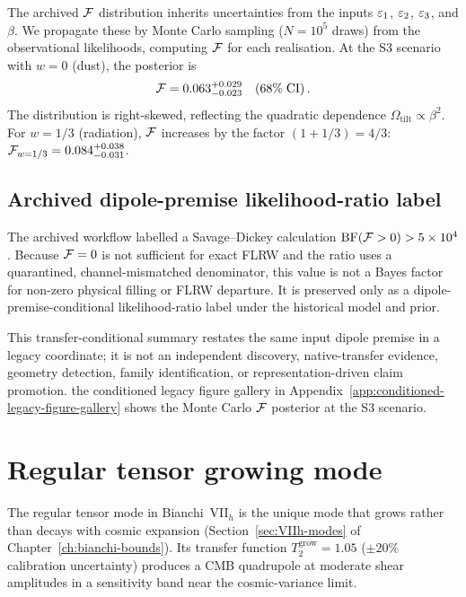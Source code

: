 The archived $\mathcal{F}$ distribution inherits uncertainties from the inputs
$\varepsilon_1$, $\varepsilon_2$, $\varepsilon_3$, and $\beta$.  We propagate these
by Monte Carlo sampling ($N = 10^5$ draws) from the
observational likelihoods, computing $\mathcal{F}$ for each realisation.
At the S3 scenario with $w = 0$ (dust), the posterior is
\begin{equation}\label{eq:FF-posterior}
\mathcal{F} = 0.063^{+0.029}_{-0.023}\quad (68\%\;\mathrm{CI})\,.
\end{equation}
The distribution is right-skewed, reflecting the quadratic
dependence $\Omega_{\mathrm{tilt}} \propto \beta^2$.
For $w = 1/3$ (radiation), $\mathcal{F}$ increases by the factor
$(1 + 1/3) = 4/3$:
$\mathcal{F}_{w=1/3} = 0.084^{+0.038}_{-0.031}$.

\subsection{Archived dipole-premise likelihood-ratio label}
\label{sec:filling-BF}

The archived workflow labelled a Savage--Dickey calculation
$\mathrm{BF}(\mathcal{F}>0)>5\times10^4$.  Because $\mathcal{F}=0$ is not
sufficient for exact FLRW and the ratio uses a quarantined,
channel-mismatched denominator, this value is not a Bayes factor
for non-zero physical filling or FLRW departure.  It is preserved
only as a dipole-premise-conditional likelihood-ratio label under
the historical model and prior.

This transfer-conditional summary restates the same input dipole
premise in a legacy coordinate; it is not an independent discovery,
native-transfer evidence, geometry detection, family
identification, or representation-driven claim promotion.
the conditioned legacy figure gallery in Appendix~\ref{app:conditioned-legacy-figure-gallery} shows the Monte Carlo
$\mathcal{F}$ posterior at the S3 scenario.


\section{Regular tensor growing mode}\label{sec:growing}

The regular tensor mode in Bianchi~VII$_h$ is the unique mode
that grows rather than decays with cosmic expansion
(Section~\ref{sec:VIIh-modes} of
Chapter~\ref{ch:bianchi-bounds}).  Its transfer function
$T_2^{\mathrm{grow}} = 1.05$ ($\pm 20\%$ calibration
uncertainty) produces a CMB quadrupole at moderate shear
amplitudes in a sensitivity band near the cosmic-variance limit.

